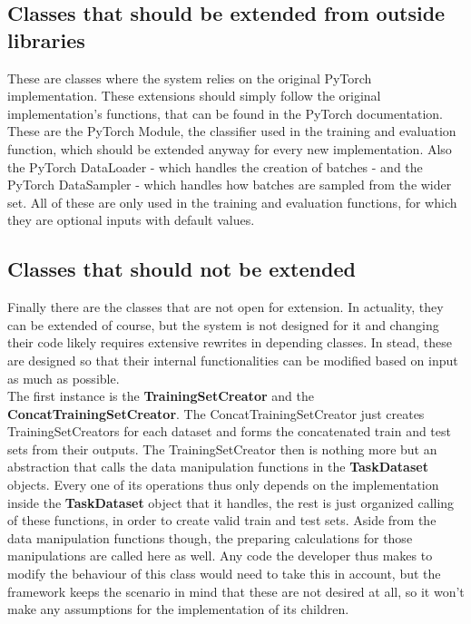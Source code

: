\subsection{Classes that should be extended from outside libraries}

These are classes where the system relies on the original PyTorch implementation. These extensions should simply follow the original implementation's functions, that can be found in the PyTorch documentation. These are the PyTorch Module, the classifier used in the training and evaluation function, which should be extended anyway for every new implementation. Also the PyTorch DataLoader - which handles the creation of batches - and the PyTorch DataSampler - which handles how batches are sampled from the wider set. All of these are only used in the training and evaluation functions, for which they are optional inputs with default values. \\

\subsection{Classes that should not be extended}

Finally there are the classes that are not open for extension. In actuality, they can be extended of course, but the system is not designed for it and changing their code likely requires extensive rewrites in depending classes. In stead, these are designed so that their internal functionalities can be modified based on input as much as possible. \\

The first instance is the \textbf{TrainingSetCreator} and the \textbf{ConcatTrainingSetCreator}. The ConcatTrainingSetCreator just creates TrainingSetCreators for each dataset and forms the concatenated train and test sets from their outputs. The TrainingSetCreator then is nothing more but an abstraction that calls the data manipulation functions in the \textbf{TaskDataset} objects. Every one of its operations thus only depends on the implementation inside the \textbf{TaskDataset} object that it handles, the rest is just organized calling of these functions, in order to create valid train and test sets. Aside from the data manipulation functions though, the preparing calculations for those manipulations are called here as well. Any code the developer thus makes to modify the behaviour of this class would need to take this in account, but the framework keeps the scenario in mind that these are not desired at all, so it won't make any assumptions for the implementation of its children. \\

